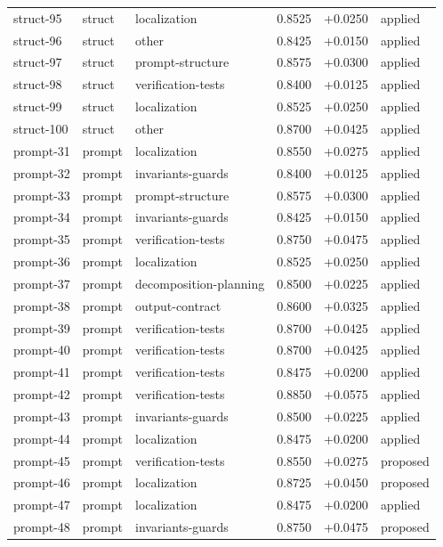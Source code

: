 \begin{center}
\begin{longtable}{llp{5.2cm}rrl}
struct-95 & struct & localization & 0.8525 & +0.0250 & applied \\
struct-96 & struct & other & 0.8425 & +0.0150 & applied \\
struct-97 & struct & prompt-structure & 0.8575 & +0.0300 & applied \\
struct-98 & struct & verification-tests & 0.8400 & +0.0125 & applied \\
struct-99 & struct & localization & 0.8525 & +0.0250 & applied \\
struct-100 & struct & other & 0.8700 & +0.0425 & applied \\
prompt-31 & prompt & localization & 0.8550 & +0.0275 & applied \\
prompt-32 & prompt & invariants-guards & 0.8400 & +0.0125 & applied \\
prompt-33 & prompt & prompt-structure & 0.8575 & +0.0300 & applied \\
prompt-34 & prompt & invariants-guards & 0.8425 & +0.0150 & applied \\
prompt-35 & prompt & verification-tests & 0.8750 & +0.0475 & applied \\
prompt-36 & prompt & localization & 0.8525 & +0.0250 & applied \\
prompt-37 & prompt & decomposition-planning & 0.8500 & +0.0225 & applied \\
prompt-38 & prompt & output-contract & 0.8600 & +0.0325 & applied \\
prompt-39 & prompt & verification-tests & 0.8700 & +0.0425 & applied \\
prompt-40 & prompt & verification-tests & 0.8700 & +0.0425 & applied \\
prompt-41 & prompt & verification-tests & 0.8475 & +0.0200 & applied \\
prompt-42 & prompt & verification-tests & 0.8850 & +0.0575 & applied \\
prompt-43 & prompt & invariants-guards & 0.8500 & +0.0225 & applied \\
prompt-44 & prompt & localization & 0.8475 & +0.0200 & applied \\
prompt-45 & prompt & verification-tests & 0.8550 & +0.0275 & proposed \\
prompt-46 & prompt & localization & 0.8725 & +0.0450 & proposed \\
prompt-47 & prompt & localization & 0.8475 & +0.0200 & applied \\
prompt-48 & prompt & invariants-guards & 0.8750 & +0.0475 & proposed \\

\end{longtable}
\end{center}
